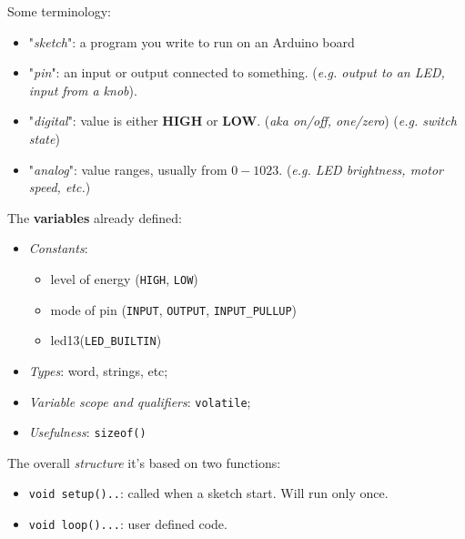 \documentclass[10pt,a4paper]{report}
\theoremstyle{definition}
\begin{document}
Some terminology:
\begin{itemize}
	\item 
	"\textit{sketch}": a program you write to run on an Arduino board
	\item 
	"\textit{pin}": an input or output connected to something. (\textit{e.g. output to an LED, input from a knob}).
	\item 
	"\textit{digital}": value is either \textbf{HIGH} or \textbf{LOW}. (\textit{aka on/off, one/zero}) (\textit{e.g. switch state})
	\item 
	"\textit{analog}": value ranges, usually from $0-1023$. (\textit{e.g. LED brightness, motor speed, etc.})
\end{itemize}
	The \textbf{variables} already defined:
\begin{itemize}
		\item 
	\textit{Constants}:
	\begin{itemize}
		\item 
		level of energy (\texttt{HIGH}, \texttt{LOW})
		\item 
		mode of pin (\texttt{INPUT}, \texttt{OUTPUT}, \texttt{INPUT\_PULLUP})
		\item 
		led13(\texttt{LED\_BUILTIN})
	\end{itemize}
	\item 
	\textit{Types}: word, strings, etc;
	\item 
	\textit{Variable scope and qualifiers}: \texttt{volatile};
	\item 
	\textit{Usefulness}: \texttt{sizeof()}
\end{itemize}

The overall \textit{structure} it's based on two functions:
\begin{itemize}
	\item 
	\texttt{void setup(){..}}: called when a sketch start. Will run only once.
	\item 
	\texttt{void loop(){...}}:  user defined code.
\end{itemize}
\end{document}
